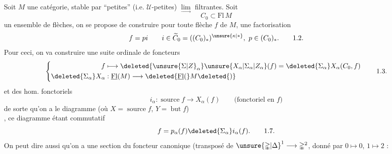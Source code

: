 Soit $M$ une catégorie, stable par ``petites'' (i.e. $\mathcal U$-petites) $\underset{\longrightarrow}{\lim}$ filtrantes. Soit
\[C_0\subset\mathrm{Fl}\,M\tag*{1.1.}\]
un  ensemble de flèches, on se propose de construire pour toute flèche $f$ de $M$, une factorisation
\[f=pi\qquad i\in\widetilde C_0=((C_0)_*)^{\unsure{\kappa|*}},\ p\in(C_0)_*.\tag*{1.2.}\]
Pour ceci, on va construire une suite ordinale de foncteurs
\[
\left\{\begin{aligned}
f&\longmapsto\deleted{\unsure{\Sigma|Z}_\alpha}\unsure{X_\alpha|\Sigma_\alpha|Z_\alpha}(f)=\deleted{\Sigma_\alpha}X_\alpha(C_0,f)\\
\deleted{\Sigma_\alpha}X_\alpha&:\underline{\mathrm{Fl}}(M)\longrightarrow\deleted{\underline{\mathrm{Fl}}(}M\deleted{)}
\end{aligned}\right.\tag*{1.3.}
\]
 et des hom. fonctoriels 
\[i_\alpha:\operatorname{source}f\longrightarrow X_\alpha(f)\qquad\text{(fonctoriel en $f$)}\tag*{1.4.}\]
\[\tag*{1.5.}\]
de sorte qu'on a le diagramme (où $X=\operatorname{source}f$, $Y=\operatorname{but}f$)
\[\tag*{1.6.}\]
, ce diagramme étant commutatif
\[f=p_\alpha(f)\deleted{\Sigma_\alpha}i_\alpha(f).\tag*{1.7.}\]
On peut dire aussi qu'on a une section du foncteur canonique  (transposé de $\unsure{\mathbb{\Delta}|\Delta}^{1}\longrightarrow\mathbb{\Delta}^{2}$, donné par $0\mapsto0$, $1\mapsto2$ :
